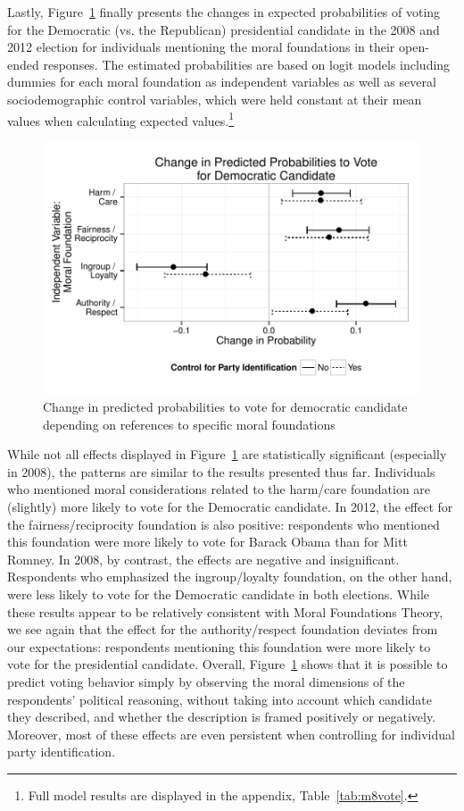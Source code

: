 \documentclass[12pt]{article}
\begin{document}
Lastly, Figure~\ref{fig:8vote} finally presents the changes in expected probabilities of voting for the Democratic (vs. the Republican) presidential candidate in the 2008 and 2012 election for individuals mentioning the moral foundations in their open-ended responses. The estimated probabilities are based on logit models including dummies for each moral foundation as independent variables as well as several sociodemographic control variables, which were held constant at their mean values when calculating expected values.\footnote{Full model results are displayed in the appendix, Table~\ref{tab:m8vote}.}

\begin{figure}[ht]\centering
\includegraphics{../calc/fig/fig8vote.pdf}
\caption{Change in predicted probabilities to vote for democratic candidate depending on references to specific moral foundations}\label{fig:8vote}
\end{figure}

While not all effects displayed in Figure~\ref{fig:8vote} are statistically significant (especially in 2008), the patterns are similar to the results presented thus far. Individuals who mentioned moral considerations related to the harm/care foundation are (slightly) more likely to vote for the Democratic candidate. In 2012, the effect for the fairness/reciprocity foundation is also positive: respondents who mentioned this foundation were more likely to vote for Barack Obama than for Mitt Romney. In 2008, by contrast, the effects are negative and insignificant. Respondents who emphasized the ingroup/loyalty foundation, on the other hand, were less likely to vote for the Democratic candidate in both elections. While these results appear to be relatively consistent with Moral Foundations Theory, we see again that the effect for the authority/respect foundation deviates from our expectations: respondents mentioning this foundation were more likely to vote for the presidential candidate. Overall, Figure~\ref{fig:8vote} shows that it is possible to predict voting behavior simply by observing the moral dimensions of the respondents' political reasoning, without taking into account which candidate they described, and whether the description is framed positively or negatively. Moreover, most of these effects are even persistent when controlling for individual party identification.
\end{document}
